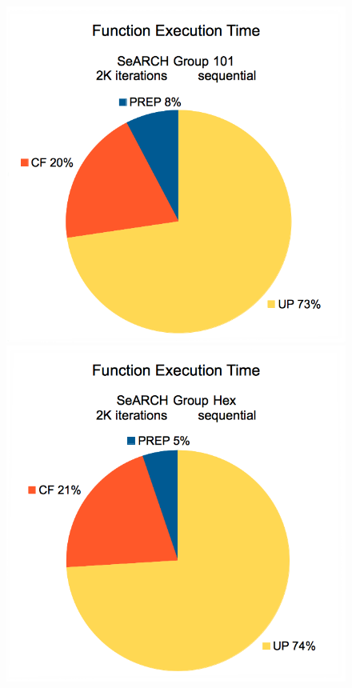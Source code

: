 \begin{figure}[!t]
	\begin{center}
		\includegraphics[width=\columnwidth]{report.may/images/loadseq101.png}
		\includegraphics[width=\columnwidth]{report.may/images/loadseqhex.png}

\end{center}
\end{figure}

